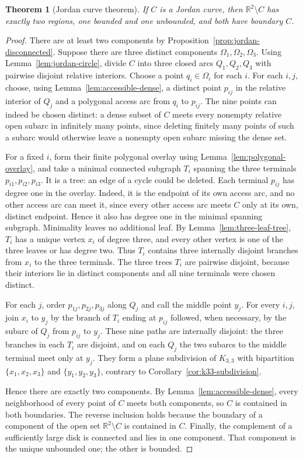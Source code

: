 \documentclass[11pt]{article}
\theoremstyle{mainplain}
\newtheorem{theorem}{Theorem}[section]
\theoremstyle{mainroman}
\theoremstyle{definition}
\numberwithin{equation}{section}
\begin{document}
\begin{theorem}[Jordan curve theorem]\label{thm:jordan}
If $C$ is a Jordan curve, then $\mathbb R^2\setminus C$ has exactly two
regions, one bounded and one unbounded, and both have boundary $C$.
\end{theorem}
\begin{proof}
There are at least two components by
Proposition~\ref{prop:jordan-disconnected}. Suppose there are three distinct
components $\Omega_1,\Omega_2,\Omega_3$. Using
Lemma~\ref{lem:jordan-circle}, divide $C$ into three closed
arcs $Q_1,Q_2,Q_3$ with pairwise disjoint relative interiors. Choose a point $q_i\in\Omega_i$ for each $i$. For each $i,j$, choose,
using Lemma~\ref{lem:accessible-dense}, a distinct point $p_{ij}$ in the
relative interior of $Q_j$ and a polygonal access arc from $q_i$ to
$p_{ij}$. The nine points can indeed be chosen distinct: a dense
subset of $C$ meets every nonempty relative open subarc in infinitely
many points, since deleting finitely many points of such a subarc
would otherwise leave a nonempty open subarc missing the dense set.

For a fixed $i$, form their finite polygonal overlay using Lemma~\ref{lem:polygonal-overlay}, and take a minimal
connected subgraph $T_i$ spanning the three terminals
$p_{i1},p_{i2},p_{i3}$. It is a tree: an edge of a cycle could be
deleted. Each terminal $p_{ij}$ has degree one in the overlay. Indeed,
it is the endpoint of its own access arc, and no other access arc can
meet it, since every other access arc meets $C$ only at its own,
distinct endpoint. Hence it also has degree one in the minimal spanning
subgraph. Minimality leaves no additional leaf. By
Lemma~\ref{lem:three-leaf-tree}, $T_i$ has a unique vertex $x_i$ of
degree three, and every other vertex is one of the three leaves or has
degree two.
Thus $T_i$ contains three internally disjoint branches from $x_i$ to
the three terminals. The three trees $T_i$ are pairwise disjoint,
because their interiors lie in distinct components and all nine
terminals were chosen distinct.

For each $j$, order $p_{1j},p_{2j},p_{3j}$ along $Q_j$ and call the
middle point $y_j$. For every $i,j$, join $x_i$ to $y_j$ by the branch
of $T_i$ ending at $p_{ij}$ followed, when necessary, by the subarc of
$Q_j$ from $p_{ij}$ to $y_j$. These nine paths are internally
disjoint: the three branches in each $T_i$ are disjoint, and on each
$Q_j$ the two subarcs to the middle terminal meet only at $y_j$. They
form a plane subdivision of $K_{3,3}$ with bipartition
$\{x_1,x_2,x_3\}$ and $\{y_1,y_2,y_3\}$, contrary to
Corollary~\ref{cor:k33-subdivision}.

Hence there are exactly two components. By
Lemma~\ref{lem:accessible-dense}, every neighborhood of every point of $C$
meets both components, so $C$ is contained in both boundaries. The
reverse inclusion holds because the boundary of a component of the
open set $\mathbb R^2\setminus C$ is contained in $C$. Finally, the
complement of a sufficiently large disk is connected and lies in one
component. That component is the unique unbounded one; the other is
bounded.
\end{proof}
\end{document}
